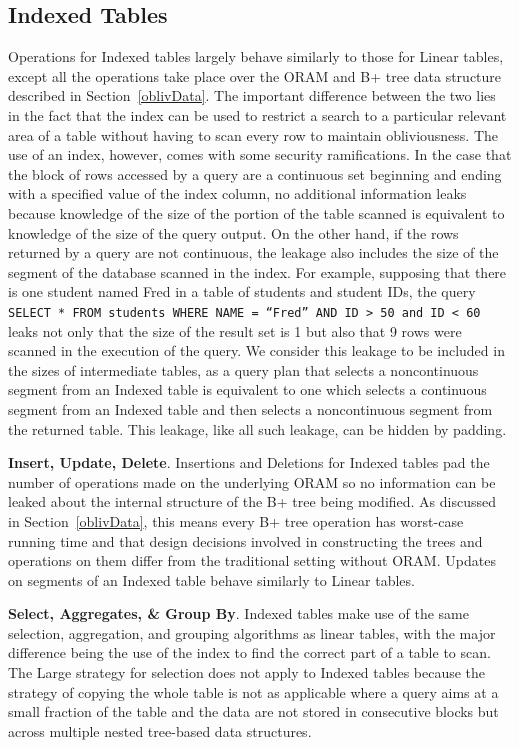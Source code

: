 \documentclass[letterpaper,twocolumn,10pt]{article}
\begin{document}
\subsection{Indexed Tables}
Operations for Indexed tables largely behave similarly to those for Linear tables, except all the operations take place over the ORAM and B+ tree data structure described in Section~\ref{oblivData}. The important difference between the two lies in the fact that the index can be used to restrict a search to a particular relevant area of a table without having to scan every row to maintain obliviousness. The use of an index, however, comes with some security ramifications. In the case that the block of rows accessed by a query are a continuous set beginning and ending with a specified value of the index column, no additional information leaks because knowledge of the size of the portion of the table scanned is equivalent to knowledge of the size of the query output. On the other hand, if the rows returned by a query are not continuous, the leakage also includes the size of the segment of the database scanned in the index. For example, supposing that there is one student named Fred in a table of students and student IDs,  the query \texttt{SELECT * FROM students WHERE NAME = ``Fred'' AND ID > 50 and ID < 60} leaks not only that the size of the result set is 1 but also that 9 rows were scanned in the execution of the query. We consider this leakage to be included in the sizes of intermediate tables, as a query plan that selects a noncontinuous segment from an Indexed table is equivalent to one which selects a continuous segment from an Indexed table and then selects a noncontinuous segment from the returned table. This leakage, like all such leakage, can be hidden by padding.

  \noindent \textbf{Insert, Update, Delete}.
  Insertions and Deletions for Indexed tables pad the number of operations made on the underlying ORAM so no information can be leaked about the internal structure of the B+ tree being modified. As discussed in Section~\ref{oblivData}, this means every B+ tree operation has worst-case running time and that design decisions involved in constructing the trees and operations on them differ from the traditional setting without ORAM. Updates on segments of an Indexed table behave similarly to Linear tables.
  
  \noindent \textbf{Select, Aggregates, \& Group By}.
  Indexed tables make use of the same selection, aggregation, and grouping algorithms as linear tables, with the major difference being the use of the index to find the correct part of a table to scan. The Large strategy for selection does not apply to Indexed tables because the strategy of copying the whole table is not as applicable where a query aims at a small fraction of the table and the data are not stored in consecutive blocks but across multiple nested tree-based data structures.  
  
\end{document}
